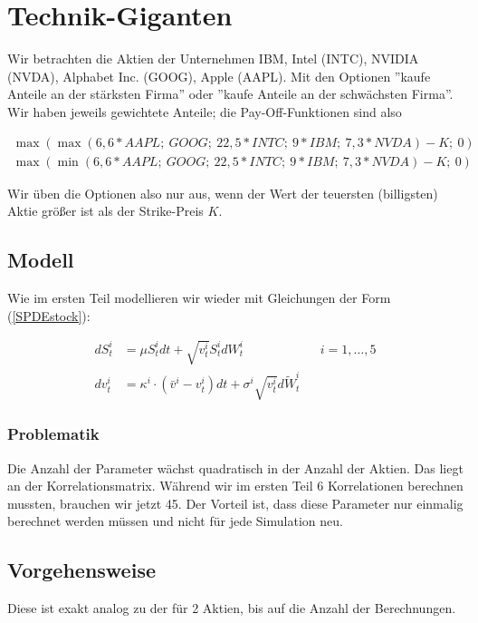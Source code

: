 \documentclass[12pt]{article}
\begin{document}
\section{Technik-Giganten}

Wir betrachten die Aktien der Unternehmen IBM, Intel (INTC), NVIDIA (NVDA), Alphabet Inc. (GOOG), Apple (AAPL). Mit den Optionen ''kaufe Anteile an der stärksten Firma'' oder ''kaufe Anteile an der schwächsten Firma''. Wir haben jeweils gewichtete Anteile; die Pay-Off-Funktionen sind also

\begin{align*}
\max(\max(6,6\ast AAPL;\ GOOG;\ 22,5\ast INTC;\ 9\ast IBM;\ 7,3\ast NVDA) -K;\ 0) \\
\max(\min(6,6\ast AAPL;\ GOOG;\ 22,5\ast INTC;\ 9\ast IBM;\ 7,3\ast NVDA) -K;\ 0)
\end{align*}

Wir üben die Optionen also nur aus, wenn der Wert der teuersten (billigsten) Aktie größer ist als der Strike-Preis $K$.


\subsection{Modell}

Wie im ersten Teil modellieren wir wieder mit Gleichungen der Form (\ref{SPDEstock}):

\begin{align*}
dS^i_t &= \mu S^i_t dt + \sqrt{v^i_t} S^i_t dW^i_t  && i=1,\dots,5\\
dv^i_t &= \kappa^i\cdot(\bar{v}^i-v^i_t) dt + \sigma^i \sqrt{v^i_t}d\tilde{W}^i_t
\end{align*}

\subsubsection{Problematik}

Die Anzahl der Parameter wächst quadratisch in der Anzahl der Aktien. Das liegt an der Korrelationsmatrix. Während wir im ersten Teil 6 Korrelationen berechnen mussten, brauchen wir jetzt 45. Der Vorteil ist, dass diese Parameter nur einmalig berechnet werden müssen und nicht für jede Simulation neu.


\subsection{Vorgehensweise}

Diese ist exakt analog zu der für 2 Aktien, bis auf die Anzahl der Berechnungen.
\end{document}
